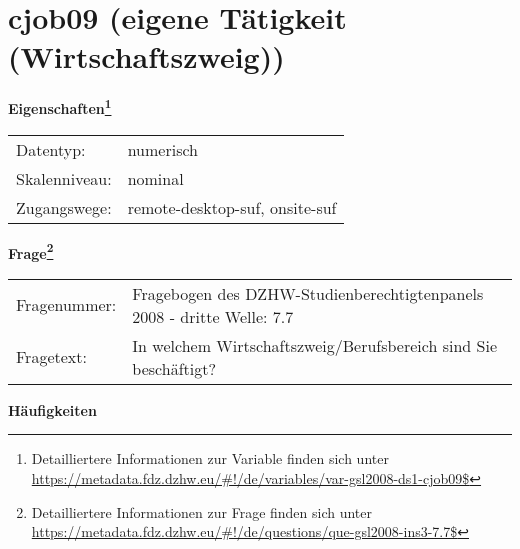 
    \setcounter{footnote}{0}

    \vspace*{-1.8cm}
	\section{cjob09 (eigene Tätigkeit (Wirtschaftszweig))}
	\label{section:cjob09}



    \vspace*{0.5cm}
    \noindent\textbf{Eigenschaften\footnote{Detailliertere Informationen zur Variable finden sich unter
		\url{https://metadata.fdz.dzhw.eu/\#!/de/variables/var-gsl2008-ds1-cjob09$}}}\\
	\begin{tabularx}{\hsize}{@{}lX}
	Datentyp: & numerisch \\
	Skalenniveau: & nominal \\
	Zugangswege: &
	  remote-desktop-suf, 
	  onsite-suf
 \\
    \end{tabularx}



				\vspace*{0.5cm}
                \noindent\textbf{Frage\footnote{Detailliertere Informationen zur Frage finden sich unter
		              \url{https://metadata.fdz.dzhw.eu/\#!/de/questions/que-gsl2008-ins3-7.7$}}}\\
				\begin{tabularx}{\hsize}{@{}lX}
					Fragenummer: &
					  Fragebogen des DZHW-Studienberechtigtenpanels 2008 - dritte Welle:
					  7.7
 \\
					Fragetext: & In welchem Wirtschaftszweig/Berufsbereich sind Sie beschäftigt? \\
				\end{tabularx}





        		\vspace*{0.5cm}
                \noindent\textbf{Häufigkeiten}

